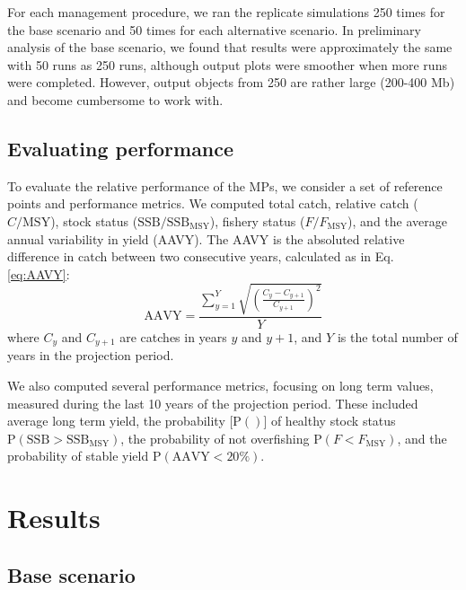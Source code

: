 \documentclass[12pt,english]{article}
\begin{document}
\begin{flushleft}
\begin{spacing}{1.9}
\begin{enumerate}
\end{enumerate}


For each management procedure, we ran the replicate simulations 250 times for the base scenario and 50 times for each alternative scenario. In preliminary analysis of the base scenario, we found that results were approximately the same with 50 runs as 250 runs, although output plots were smoother when more runs were completed. However, output objects from 250 are rather large (200-400 Mb) and become cumbersome to work with.

\subsection*{Evaluating performance}
To evaluate the relative performance of the MPs, we consider a set of reference points and performance metrics. We computed total catch, relative catch ($C/\mathrm{MSY}$), stock status ($\mathrm{SSB/SSB_{MSY}}$), fishery status ($F/F_{\mathrm{MSY}}$), and the average annual variability in yield (AAVY). The AAVY is the absoluted relative difference in catch between two consecutive years, calculated as in Eq. \ref{eq:AAVY}:
\begin{equation}
\mathrm{AAVY} = \frac{\sum_{y=1}^{Y}\sqrt{(\frac{C_{y}-C_{y+1}}{C_{y+1}})^{2}}}{Y}
\label{eq:AAVY}
\end{equation}
where $C_{y}$ and $C_{y+1}$ are catches in years $y$ and $y+1$, and $Y$ is the total number of years in the projection period.

We also computed several performance metrics, focusing on long term values, measured during the last 10 years of the projection period. These included average long term yield, the probability [$\mathrm{P()}$] of healthy stock status $\mathrm{P(SSB>SSB_{MSY})}$, the probability of not overfishing $\mathrm{P}(F<F_{\mathrm{MSY}})$, and the probability of stable yield $\mathrm{P(AAVY<20\%)}$.

\section*{Results}

\subsection*{Base scenario}


\end{spacing}
\end{flushleft}
\end{document}
